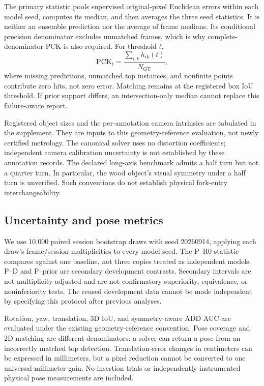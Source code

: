 \documentclass[journal]{IEEEtran}
\begin{document}
The primary statistic pools supervised original-pixel Euclidean errors within each model seed, computes its median, and then averages the three seed statistics. It is neither an ensemble prediction nor the average of frame medians. Its conditional precision denominator excludes unmatched frames, which is why complete-denominator PCK is also required. For threshold $t$,
\begin{equation}
\mathrm{PCK}_{t}=\frac{\sum_{i,k}h_{ik}(t)}{N_{\mathrm{GT}}},
\end{equation}
where missing predictions, unmatched top instances, and nonfinite points contribute zero hits, not zero error. Matching remains at the registered box IoU threshold. If prior support differs, an intersection-only median cannot replace this failure-aware report.

Registered object sizes and the per-annotation camera intrinsics are tabulated in the supplement. They are inputs to this geometry-reference evaluation, not newly certified metrology. The canonical solver uses no distortion coefficients; independent camera calibration uncertainty is not established by these annotation records. The declared long-axis benchmark admits a half turn but not a quarter turn. In particular, the wood object's visual symmetry under a half turn is unverified. Such conventions do not establish physical fork-entry interchangeability.

\subsection{Uncertainty and pose metrics}
We use 10,000 paired session bootstrap draws with seed 20260914, applying each draw's frame/session multiplicities to every model seed. The P--R0 statistic compares against one baseline, not three copies treated as independent models. P--D and P--prior are secondary development contrasts. Secondary intervals are not multiplicity-adjusted and are not confirmatory superiority, equivalence, or noninferiority tests. The reused development data cannot be made independent by specifying this protocol after previous analyses.

Rotation, yaw, translation, 3D IoU, and symmetry-aware ADD AUC are evaluated under the existing geometry-reference convention. Pose coverage and 2D matching are different denominators: a solver can return a pose from an incorrectly matched top detection. Translation-error changes in centimeters can be expressed in millimeters, but a pixel reduction cannot be converted to one universal millimeter gain. No insertion trials or independently instrumented physical pose measurements are included.
\end{document}
